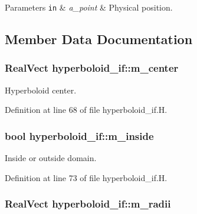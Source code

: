 \begin{DoxyParams}[1]{Parameters}
\mbox{\tt in}  & {\em a\+\_\+point} & Physical position. \\
\hline
\end{DoxyParams}


\subsection{Member Data Documentation}
\subsubsection[{\texorpdfstring{m\+\_\+center}{m_center}}]{\setlength{\rightskip}{0pt plus 5cm}Real\+Vect hyperboloid\+\_\+if\+::m\+\_\+center\hspace{0.3cm}{\ttfamily [protected]}}\hypertarget{classhyperboloid__if_aa5a7c54cb7bba001787b06a01c9d3d2c}{}\label{classhyperboloid__if_aa5a7c54cb7bba001787b06a01c9d3d2c}


Hyperboloid center. 



Definition at line 68 of file hyperboloid\+\_\+if.\+H.

\subsubsection[{\texorpdfstring{m\+\_\+inside}{m_inside}}]{\setlength{\rightskip}{0pt plus 5cm}bool hyperboloid\+\_\+if\+::m\+\_\+inside\hspace{0.3cm}{\ttfamily [protected]}}\hypertarget{classhyperboloid__if_a7ec285cac539bcb1e7bdecdcac6ffa7c}{}\label{classhyperboloid__if_a7ec285cac539bcb1e7bdecdcac6ffa7c}


Inside or outside domain. 



Definition at line 73 of file hyperboloid\+\_\+if.\+H.

\subsubsection[{\texorpdfstring{m\+\_\+radii}{m_radii}}]{\setlength{\rightskip}{0pt plus 5cm}Real\+Vect hyperboloid\+\_\+if\+::m\+\_\+radii\hspace{0.3cm}{\ttfamily [protected]}}\hypertarget{classhyperboloid__if_a40f58c885e633e217051a5f0f544189f}{}\label{classhyperboloid__if_a40f58c885e633e217051a5f0f544189f}



